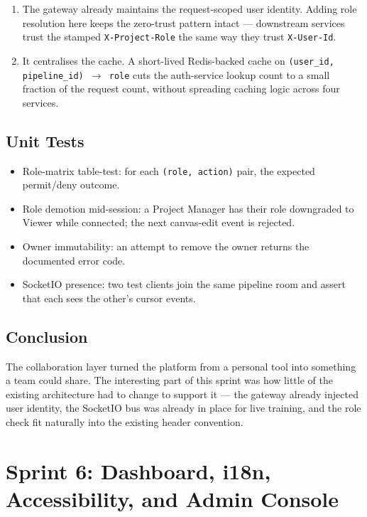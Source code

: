 \documentclass[12pt, a4paper]{report}
\begin{document}
\begin{enumerate}
    \item The gateway already maintains the request-scoped user
        identity. Adding role resolution here keeps the
        zero-trust pattern intact --- downstream services trust
        the stamped \texttt{X-Project-Role} the same way they
        trust \texttt{X-User-Id}.
    \item It centralises the cache. A short-lived Redis-backed
        cache on \texttt{(user\_id, pipeline\_id) $\to$ role}
        cuts the auth-service lookup count to a small fraction
        of the request count, without spreading caching logic
        across four services.
\end{enumerate}

\section{Unit Tests}

\begin{itemize}
    \item Role-matrix table-test: for each
        \texttt{(role, action)} pair, the expected
        permit/deny outcome.
    \item Role demotion mid-session: a Project Manager has their
        role downgraded to Viewer while connected; the next
        canvas-edit event is rejected.
    \item Owner immutability: an attempt to remove the owner
        returns the documented error code.
    \item SocketIO presence: two test clients join the same
        pipeline room and assert that each sees the other's
        cursor events.
\end{itemize}

\section*{Conclusion}

The collaboration layer turned the platform from a personal tool
into something a team could share. The interesting part of this
sprint was how little of the existing architecture had to change to
support it --- the gateway already injected user identity, the
SocketIO bus was already in place for live training, and the role
check fit naturally into the existing header convention.

\chapter{Sprint 6: Dashboard, i18n, Accessibility, and Admin Console}
\end{document}
